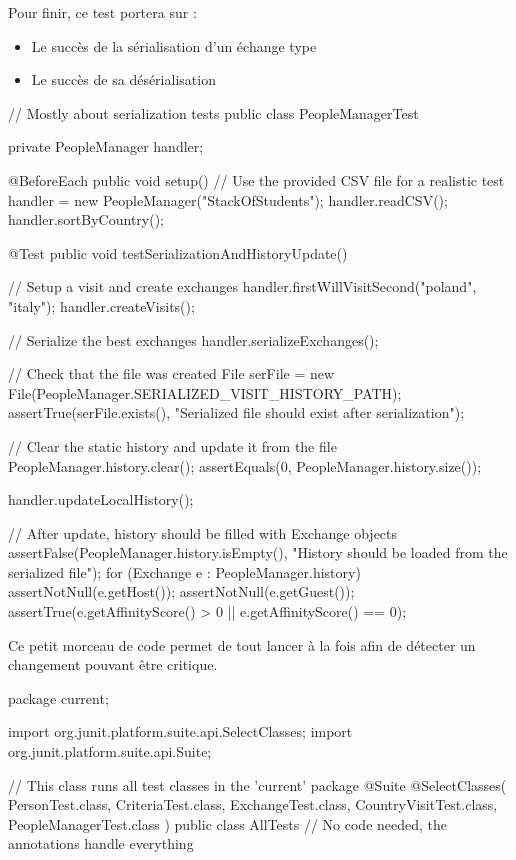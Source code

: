 \documentclass{mytex}
\begin{document}

Pour finir, ce test portera sur :

\begin{itemize}
	\item Le succès de la sérialisation d'un échange type
	\item Le succès de sa désérialisation
\end{itemize}

\begin{codebox}
// Mostly about serialization tests
public class PeopleManagerTest {
	
	private PeopleManager handler;
	
	@BeforeEach
	public void setup() {
		// Use the provided CSV file for a realistic test
		handler = new PeopleManager("StackOfStudents");
		handler.readCSV();
		handler.sortByCountry();
	}
	
	@Test
	public void testSerializationAndHistoryUpdate() {
		// Setup a visit and create exchanges
		handler.firstWillVisitSecond("poland", "italy");
		handler.createVisits();
		
		// Serialize the best exchanges
		handler.serializeExchanges();
		
		// Check that the file was created
		File serFile = new File(PeopleManager.SERIALIZED_VISIT_HISTORY_PATH);
		assertTrue(serFile.exists(), "Serialized file should exist after serialization");
		
		// Clear the static history and update it from the file
		PeopleManager.history.clear();
		assertEquals(0, PeopleManager.history.size());
		
		handler.updateLocalHistory();
		
		// After update, history should be filled with Exchange objects
		assertFalse(PeopleManager.history.isEmpty(), "History should be loaded from the serialized file");
		for (Exchange e : PeopleManager.history) {
			assertNotNull(e.getHost());
			assertNotNull(e.getGuest());
			assertTrue(e.getAffinityScore() > 0 || e.getAffinityScore() == 0);
		}
	}
}
\end{codebox}


Ce petit morceau de code permet de tout lancer à la fois afin de détecter un changement pouvant être critique.

\begin{codebox}
package current;

import org.junit.platform.suite.api.SelectClasses;
import org.junit.platform.suite.api.Suite;

// This class runs all test classes in the 'current' package
@Suite
@SelectClasses({
	PersonTest.class,
	CriteriaTest.class,
	ExchangeTest.class,
	CountryVisitTest.class,
	PeopleManagerTest.class
})
public class AllTests {
	// No code needed, the annotations handle everything
}
\end{codebox}
\end{document}
